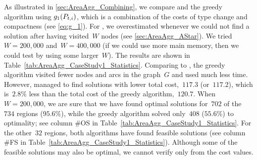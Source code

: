 As illustrated in \sect\ref{sec:AreaAgg_Combining},
we compare \Astar and the greedy algorithm using $g_1(P_{t,i})$,
which is a combination of the costs 
of type change and compactness (see \eq\ref{eq:g_1}).
For \Astar, we overestimated 
whenever we could not find a solution after 
having visited~$W$ nodes 
(see \sect\ref{sec:AreaAgg_AStar}).
We tried~$W=200{,}000$ and~$W=400{,}000$
(if we could use more main memory, 
then we could test by using some larger~$W$). 
The results are shown in 
Table~\ref{tab:AreaAgg_CaseStudy1_Statistics}.
%
Comparing to \Astar, 
the greedy algorithm visited 
fewer nodes and arcs in the graph~$G$ 
and used much less time.
However, 
\Astar managed to find solutions with 
lower total cost,~$117.3$ (or~$117.2$), 
which is~$2.8\%$ less than 
the total cost of the greedy algorithm,~$120.7$.
%
When~$W=200{,}000$, we are sure that 
we have found optimal solutions 
for~$702$ of the~$734$ regions ($95.6\%$),
while the greedy algorithm solved 
only~$408$ ($55.6\%$) to optimality;
see column \#OS in 
Table~\ref{tab:AreaAgg_CaseStudy1_Statistics}.
For the other~$32$ regions, 
both algorithms have found feasible solutions 
(see column \#FS in 
Table~\ref{tab:AreaAgg_CaseStudy1_Statistics}).
Although some of the feasible solutions may also be optimal,
we cannot verify only from the cost values.


